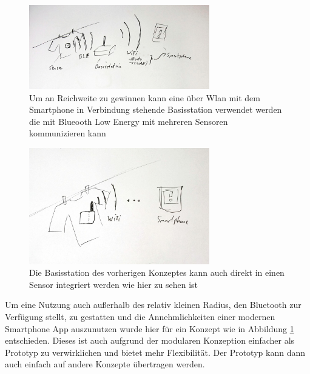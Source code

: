 \begin{figure}[htb] 
	\centerline{\includegraphics*[width=0.7\textwidth]{./10+10/Detail/01_ble_basisstation_wifi_app}}
	\caption{Um an Reichweite zu gewinnen kann eine über Wlan mit dem Smartphone in Verbindung stehende Basisstation verwendet werden die mit Blueooth Low Energy mit mehreren Sensoren kommunizieren kann}
	\label{10+10_ble_basis_wifi_app}
\end{figure}
\begin{figure}[htb] 
	\centerline{\includegraphics*[width=0.7\textwidth]{./10+10/Detail/04_wifi_app}}
	\caption{Die Basisstation des vorherigen Konzeptes kann auch direkt in einen Sensor integriert werden wie hier zu sehen ist}
	\label{10+10_wifi_app}
\end{figure}
\FloatBarrier
Um eine Nutzung auch außerhalb des relativ kleinen Radius, den Bluetooth zur Verfügung stellt, zu gestatten und die Annehmlichkeiten einer modernen Smartphone App auszunutzen wurde hier für ein Konzept wie in Abbildung \ref{10+10_ble_basis_wifi_app} entschieden. Dieses ist auch aufgrund der modularen Konzeption einfacher als Prototyp zu verwirklichen und bietet mehr Flexibilität. Der Prototyp kann dann auch einfach auf andere Konzepte übertragen werden.

